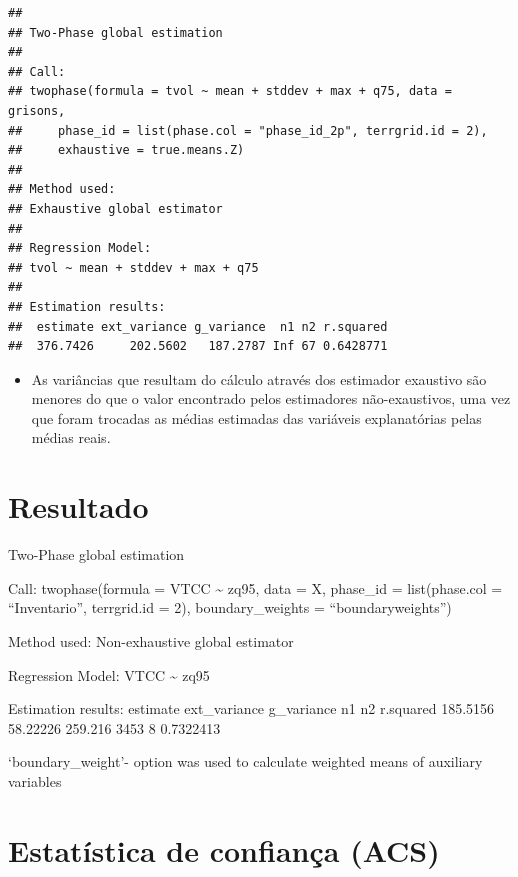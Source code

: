 \documentclass[
]{article}
\providecommand{\tightlist}{%
  \setlength{\itemsep}{0pt}\setlength{\parskip}{0pt}}
\begin{document}
\begin{verbatim}
## 
## Two-Phase global estimation
##  
## Call: 
## twophase(formula = tvol ~ mean + stddev + max + q75, data = grisons, 
##     phase_id = list(phase.col = "phase_id_2p", terrgrid.id = 2), 
##     exhaustive = true.means.Z)
## 
## Method used:
## Exhaustive global estimator
##  
## Regression Model:
## tvol ~ mean + stddev + max + q75
## 
## Estimation results:
##  estimate ext_variance g_variance  n1 n2 r.squared
##  376.7426     202.5602   187.2787 Inf 67 0.6428771
\end{verbatim}

\begin{itemize}
\tightlist
\item
  As variâncias que resultam do cálculo através dos estimador exaustivo
  são menores do que o valor encontrado pelos estimadores
  não-exaustivos, uma vez que foram trocadas as médias estimadas das
  variáveis explanatórias pelas médias reais.
\end{itemize}

\section{Resultado}\label{resultado}

Two-Phase global estimation

Call: twophase(formula = VTCC \textasciitilde{} zq95, data = X,
phase\_id = list(phase.col = ``Inventario'', terrgrid.id = 2),
boundary\_weights = ``boundaryweights'')

Method used: Non-exhaustive global estimator

Regression Model: VTCC \textasciitilde{} zq95

Estimation results: estimate ext\_variance g\_variance n1 n2 r.squared
185.5156 58.22226 259.216 3453 8 0.7322413

`boundary\_weight'- option was used to calculate weighted means of
auxiliary variables

\section{Estatística de confiança
(ACS)}\label{estatuxedstica-de-confianuxe7a-acs}
\end{document}

